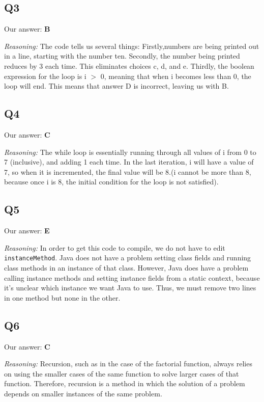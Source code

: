 \documentclass{article}
\begin{document}
\subsection{Q3}

Our answer: \textbf{B}

\noindent\textit{Reasoning:} The code tells us several things: 
Firstly,numbers are being printed out in a line, starting with the number ten. Secondly, the number being printed reduces by 3 each time. This eliminates choices c, d, and e. Thirdly, the boolean expression for the loop is i $>$ 0, meaning that when i becomes less than 0, the loop will end. This means that answer D is incorrect, leaving us with B. 

\subsection{Q4}

Our answer: \textbf{C}

\noindent\textit{Reasoning:} The while loop is essentially running through all values of i from 0 to 7 (inclusive), and adding 1 each time. In the last iteration, i will have a value of 7, so when it is incremented, the final value will be 8.(i cannot be more than 8, because once i is 8, the initial condition for the loop is not satisfied). 

\subsection{Q5}

Our answer: \textbf{E}

\noindent\textit{Reasoning:} In order to get this code to compile, we do not have to edit \verb|instanceMethod|. Java does not have a problem setting class fields and running class methods in an instance of that class. However, Java does have a problem calling instance methods and setting instance fields from a static context, because it's unclear which instance we want Java to use. Thus, we must remove two lines in one method but none in the other.


\subsection{Q6}

Our answer: \textbf{C}

\noindent\textit{Reasoning:} Recursion, such as in the case of the factorial function, always relies on using the smaller cases of the same function to solve larger cases of that function. Therefore, recursion is a method in which the solution of a problem depends on smaller instances of the same problem. 
\end{document}
